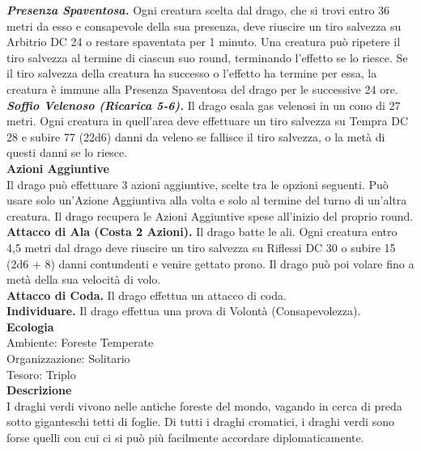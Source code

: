 \begin{multicols}{2}
\emph{\textbf{Presenza Spaventosa.}} Ogni creatura scelta dal drago, che si trovi entro 36 metri da esso e consapevole della sua presenza, deve riuscire un tiro salvezza su Arbitrio DC  24 o restare spaventata per 1 minuto. Una creatura può ripetere il tiro salvezza al termine di ciascun suo round, terminando l'effetto se lo riesce. Se il tiro salvezza della creatura ha successo o l'effetto ha termine per essa, la creatura è immune alla Presenza Spaventosa del drago per le successive 24 ore.\\
\emph{\textbf{Soffio Velenoso (Ricarica 5-6).}} Il drago esala gas velenosi in un cono di 27 metri. Ogni creatura in quell'area deve effettuare un tiro salvezza su Tempra DC  28 e subire 77 (22d6) danni da veleno se fallisce il tiro salvezza, o la metà di questi danni se lo riesce.\\
\textbf{Azioni Aggiuntive}\\
Il drago può effettuare 3 azioni aggiuntive, scelte tra le opzioni seguenti. Può usare solo un'Azione Aggiuntiva alla volta e solo al termine del turno di un'altra creatura. Il drago recupera le Azioni Aggiuntive spese all'inizio del proprio round.\\
\textbf{Attacco di Ala (Costa 2 Azioni).} Il drago batte le ali. Ogni creatura entro 4,5 metri dal  drago deve riuscire un tiro salvezza su Riflessi DC  30 o subire 15 (2d6 + 8) danni contundenti e venire gettato prono. Il drago può poi volare fino a metà della sua velocità di volo. \\
\textbf{Attacco di Coda.} Il drago effettua un attacco di coda.\\
\textbf{Individuare.} Il drago effettua una prova di Volontà (Consapevolezza).\\
\textbf{Ecologia}\\
Ambiente: Foreste Temperate\\
Organizzazione: Solitario\\
Tesoro: Triplo\\
\textbf{Descrizione}\\
I draghi verdi vivono nelle antiche foreste del mondo, vagando in cerca di preda sotto giganteschi tetti di foglie. Di tutti i draghi cromatici, i draghi verdi sono forse quelli con cui ci si può più facilmente accordare diplomaticamente.\\


\end{multicols}

